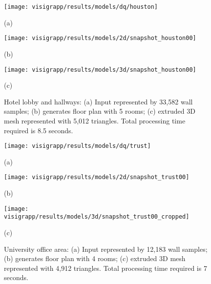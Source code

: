 \documentclass[12pt,onecolumn,oneside]{book}
\begin{document}
\begin{figure}
	\centering
	
	\begin{minipage}[b]{0.4950\linewidth}
	\centerline{\texttt{[image: visigrapp/results/models/dq/houston]}}
	\centerline{(a)}
	\end{minipage}
	\hfill
	\begin{minipage}[b]{0.4950\linewidth}
	\centerline{\texttt{[image: visigrapp/results/models/2d/snapshot\_houston00]}}
	\centerline{(b)}
	\end{minipage}
	\begin{minipage}[b]{0.95\linewidth}
	\centerline{\texttt{[image: visigrapp/results/models/3d/snapshot\_houston00]}}
	\centerline{(c)}
	\end{minipage}

	\caption[Floor plan of a hotel lobby and hallways.]{Hotel lobby and hallways: (a) Input represented by 33,582 wall samples; (b) generates floor plan with 5 rooms; (c) extruded 3D mesh represented with 5,012 triangles.  Total processing time required is 8.5 seconds.}
	\label{fig:visigrapp_results_b}
\end{figure}

\begin{figure}[t]
	\centering
	
	\begin{minipage}[b]{0.495\linewidth}
	\centerline{\texttt{[image: visigrapp/results/models/dq/trust]}}
	\centerline{(a)}
	\end{minipage}
	\hfill
	\begin{minipage}[b]{0.495\linewidth}
	\centerline{\texttt{[image: visigrapp/results/models/2d/snapshot\_trust00]}}
	\centerline{(b)}
	\end{minipage}
	\begin{minipage}[b]{0.95\linewidth}
	\centerline{\texttt{[image: visigrapp/results/models/3d/snapshot\_trust00\_cropped]}}
	\centerline{(c)}
	\end{minipage}

	\caption[Floor plan of a university office area.]{University office area: (a) Input represented by 12,183 wall samples; (b) generates floor plan with 4 rooms; (c) extruded 3D mesh represented with 4,912 triangles.  Total processing time required is 7 seconds.}
	\label{fig:visigrapp_results_c}
\end{figure}
\end{document}
